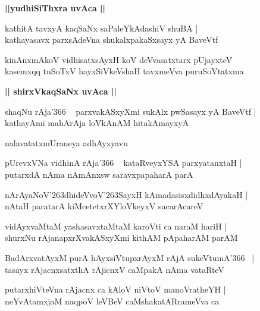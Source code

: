 \documentclass[twoside,12pt,openright]{book}
\def\S{\char'263}
\newcounter{shloka}[chapter]
\def\uvaca#1{\centerline{{\large\textbf{#1}}}}
\begin{document}
\uvaca{||yudhiSiThxra uvAca ||}

\begin{shloka}%
kathitA tavxyA kaqSaNx saPaleYkAdashiV shuBA |\\
kathayasavx parxsAdeVna shukalxpakaSxsayx yA BaveVtf
\end{shloka}

\begin{shloka}%
kinAnxmAkoV vidhisatxsAyxH koV deVvasatxtarx pUjayxteV \\
kasemxqq tuSoTxV hayxSiVkeVshaH tavxmeVva puruSoVtatxma
\end{shloka}

\uvaca{|| shirxVkaqSaNx uvAca ||}

\begin{shloka}%
shaqNu rAja\char'366 ~ parxvakASxyXmi sukAlx pwSasayx yA BaveVtf |\\
kathayAmi mahArAja loVkAnAM hitakAmayxyA
\end{shloka}

\begin{center}
nalavatatxmUraneya adhAyxyavu
\end{center}

\begin{shloka}%
pUrevxVNa vidhinA rAja\char'366 ~ kataRveyxYSA parxyatanxtaH |\\
putarxdA nAma nAmAnxsw saravxpapaharA parA
\end{shloka}

\begin{shloka}%
nArAyaNoV\S dhideVvoV\S SayxH kAmadasisxdidhxdAyakaH |\\
nAtaH paratarA kiMcetetxrXYloVkeyxV sacarAcareV 
\end{shloka}

\begin{shloka}%
vidAyxvaMtaM yashasavxtaMtaM karoVti ca naraM hariH |\\
shurxNu rAjanapxrXvakASxyXmi kithAM pApaharAM parAM
\end{shloka}

\begin{shloka}%
BadArxvatAyxM purA hAyxsiVtupxrAyxM rAjA sukeVtumA\char'366 ~|\\
tasayx rAjacnxsatxthA rAjicnxV caMpakA nAma vataRteV
\end{shloka}

\begin{shloka}%
putarxhiVteVna rAjacnx ca kAloV niVtoV manoVratheYH |\\
neYvAtamxjaM naqpoV leVBeV caMshakatARrameVva ca
\end{shloka}
\end{document}

